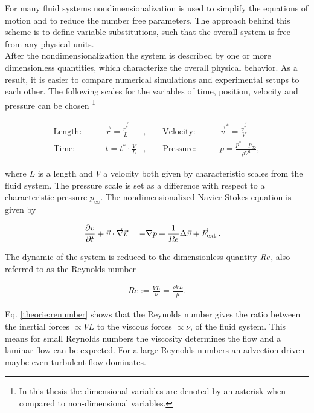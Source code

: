 For many fluid systems nondimensionalization is used to simplify the equations of motion and to reduce the number free parameters.
The approach behind this scheme is to define variable substitutions, such that the overall system is free from any physical units.\\
After the nondimensionalization the system is described by one or more dimensionless quantities, which characterize the overall physical behavior.
As a result, it is easier to compare numerical simulations and experimental setups to each other.
The following scales for the variables of time, position, velocity and pressure can be chosen \cite{Kundu2012}
\footnote{In this thesis the dimensional variables are denoted by an asterisk when compared to non-dimensional variables.}

\begin{align}
    \text{Length:}\qquad &  \vec{r} = \frac{\vec{r^*}}{L}  &, \qquad \text{Velocity:}\qquad& \vec{v}^* = \frac{\vec{v^*}}{V}\\
    \text{Time:}  \qquad & t = t^* \cdot \frac{V}{L}      &,  \qquad  \text{Pressure:}\qquad & p = \frac{p^* - p_\infty}{\rho V^2},
\end{align}

where  $L$ is a length and $V$  a velocity both given by characteristic scales from the fluid system.
The pressure scale is set as a difference with respect to a characteristic pressure $p_\infty$.
The nondimensionalized Navier-Stokes equation is given by

\begin{align}
    \pdn[v]{t} + \vec{v} \cdot \vec{\nabla} \vec{v} &= -\nabla p + \frac{1}{Re} \Delta \vec{v} + \vec{F}_{\text{ext.}}.
\end{align}

The dynamic of the system is reduced to the dimensionless quantity $\Rey$, also referred to as the Reynolds number \citep{Kundu2012}

\begin{align}
    \label{theorie:renumber}
    Re := \frac{VL}{\nu} = \frac{\rho VL}{\mu}.
\end{align}

Eq. \ref{theorie:renumber} shows that the Reynolds number gives the ratio between the inertial forces $\propto VL$
to the viscous forces $\propto \nu$, of the fluid system.
This means for small Reynolds numbers the viscosity determines the flow and a laminar flow can be expected.
For a large Reynolds numbers an  advection driven maybe even turbulent flow dominates.
\clearpage

